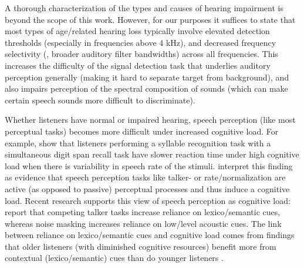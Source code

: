 A thorough characterization of the types and causes of hearing impairment is beyond the scope of this work.\footnotemark{}  However, for our purposes it suffices to state that most types of age\-/related hearing loss typically involve elevated detection thresholds (especially in frequencies above 4 kHz), and decreased frequency selectivity (\ie, broader auditory filter bandwidths) across all frequencies.  This increases the difficulty of the signal detection task that underlies auditory perception generally (making it hard to separate target from background), and also impairs perception of the spectral composition of sounds (which can make certain speech sounds more difficult to discriminate).

Whether listeners have normal or impaired hearing, speech perception (like most perceptual tasks) becomes more difficult under increased cognitive load.  For example, \citet{FrancisNusbaum1996} show that listeners performing a syllable recognition task with a simultaneous digit span recall task have slower reaction time under high cognitive load when there is variability in speech rate of the stimuli.  \citeauthor*{FrancisNusbaum1996} interpret this finding as evidence that speech perception tasks like talker- or rate\-/normalization are active (as opposed to passive) perceptual processes and thus induce a cognitive load.  Recent research supports this view of speech perception as cognitive load: \citet{MattysEtAl2009} report that competing talker tasks increase reliance on lexico\-/semantic cues, whereas noise masking increases reliance on low\-/level acoustic cues.  The link between reliance on lexico\-/semantic cues and cognitive load comes from findings that older listeners (with diminished cognitive resources) benefit more from contextual (lexico\-/semantic) cues than do younger listeners \citep{PichoraFullerEtAl1995, SommersDanielson1999}.  %

